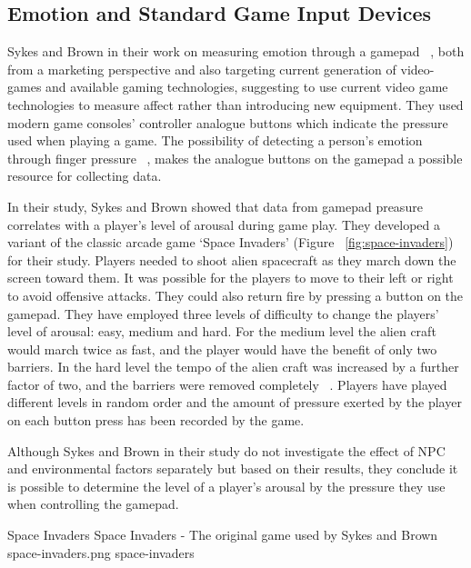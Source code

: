 \subsection{Emotion and Standard Game Input Devices}
Sykes and Brown in their work on measuring emotion through a gamepad ~\cite{sykes2003affective}, both from a marketing perspective and also targeting current generation of video-games and available gaming technologies, suggesting to use current video game technologies to measure affect rather than introducing new equipment. They used modern game consoles' controller analogue buttons which indicate the pressure used when playing a game. The possibility of detecting a person's emotion through finger pressure ~\cite{clynes1977sentics}, makes the analogue buttons on the gamepad a possible resource for collecting data.

In their study, Sykes and Brown showed that data from gamepad preasure correlates with a player's level of arousal during game play. They developed a variant of the classic arcade game `Space Invaders' (Figure ~\ref{fig:space-invaders}) for their study. Players needed to shoot alien spacecraft as they march down the screen toward them. It was possible for the players to move to their left or right to avoid offensive attacks. They could also return fire by pressing a button on the gamepad. They have employed three levels of difficulty to change the players' level of arousal: easy, medium and hard. For the medium level the alien craft would march twice as fast, and the player would have the benefit of only two barriers. In the hard level the tempo of the alien craft was increased by a further factor of two, and the barriers were removed completely ~\cite{sykes2003affective}. Players have played different levels in random order and the amount of pressure exerted by the player on each button press has been recorded by the game.

Although Sykes and Brown in their study do not investigate the effect of NPC and environmental factors separately but based on their results, they conclude it is possible to determine the level of a player's arousal by the pressure they use when controlling the gamepad.

\img
{Space Invaders}
{Space Invaders - The original game used by Sykes and Brown}
{space-invaders.png}
{space-invaders}

